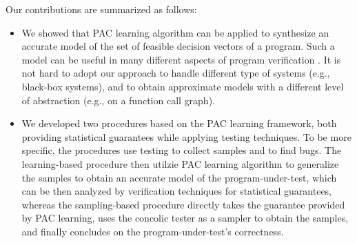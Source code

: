 Our contributions are summarized as follows:
\begin{itemize}
	\item We showed that PAC learning algorithm can be applied to synthesize an accurate model of the set of feasible decision vectors of a program. Such a model can be useful in many different aspects of program verification . It is not hard to adopt our approach to handle different type of systems (e.g., black-box systems), and to obtain approximate models with a different level of abstraction (e.g., on a function call graph).
	\item We developed two procedures based on the PAC learning framework, both providing statistical guarantees while applying testing techniques. To be more specific, the procedures use testing to collect samples and to find bugs. The learning-based procedure then utilzie PAC learning algorithm to generalize the samples to obtain an accurate model of the program-under-test, which can be then analyzed by verification techniques for statistical guarantees, whereas the sampling-based procedure directly takes the guarantee provided by PAC learning, uses the concolic tester as a sampler to obtain the samples, and finally concludes on the program-under-test's correctness. 
\end{itemize}


